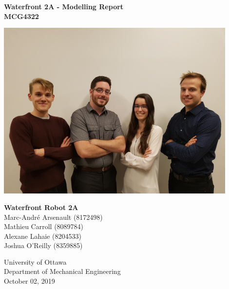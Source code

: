 
\begin{titlepage}
    \begin{center}
        \textbf{Waterfront 2A - Modelling Report}\\
        \textbf{MCG4322}
        
        \vfill
        
        \includegraphics[width=12cm]{team_picture.jpg}
        
        \vfill
        
        \textbf{Waterfront Robot 2A}\\
        Marc-André Arsenault (8172498)\\
        Mathieu Carroll (8089784)\\
        Alexane Lahaie (8204533)\\
        Joshua O'Reilly (8359885)\\
  
        \vfill
  
        University of Ottawa\\
        Department of Mechanical Engineering\\
        October 02, 2019
  
    \end{center}
 \end{titlepage}